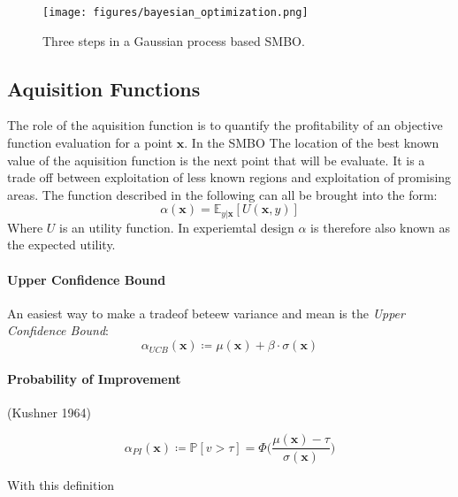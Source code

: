 \documentclass[english]{article}
\newcommand{\x}{\mathbf{x}}
\newcommand{\E}{\mathbb{E}}
\begin{document}
\begin{figure}
  \texttt{[image: figures/bayesian\_optimization.png]}
  \caption{Three steps in a Gaussian process based SMBO.}
  \label{bayesian optimization}
\end{figure}

\subsection{Aquisition Functions}
\label{aquifuncs}
The role of the aquisition function is to quantify the profitability of an objective function evaluation for a point $\x$. In the SMBO The location of the best known value of the aquisition function is the next point that will be evaluate. It is a trade off between exploitation of less known regions and exploitation of promising areas. The function described in the following can all be brought into the form:
\begin{equation}
  \alpha(\x) = \E_{y|\x}[U(\x,y)]
\end{equation}
Where $U$ is an utility function. In experiemtal design $\alpha$ is therefore also known as the expected utility.

\paragraph{Upper Confidence Bound}
An easiest way to make a tradeof beteew variance and mean is the \textit{Upper Confidence Bound}:
\begin{equation}
  \alpha_{UCB}(\x) \coloneqq \mu(\x) + \beta \cdot \sigma(\x)
\end{equation}

\paragraph{Probability of Improvement}

(Kushner 1964)

\begin{equation}
  \alpha_{PI}(\x) \coloneqq \mathbb{P}[v>\tau] = \Phi\bigg(\frac{\mu(\x)-\tau}{\sigma(\x)}\bigg)
\end{equation}

With this definition
\end{document}
